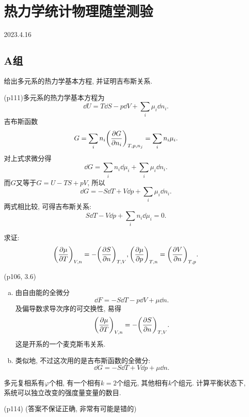 \section{热力学统计物理随堂测验}
2023.4.16
\subsection{A组}
\begin{questions}
  \question 给出多元系的热力学基本方程, 并证明吉布斯关系.
  \begin{solution}
    (p111)多元系的热力学基本方程为
    \begin{equation}
      \dd U = T\dd S - p\dd V + \sum_i \mu_i\dd n_i.
    \end{equation}
    吉布斯函数
    \begin{equation}
      G = \sum_i n_i\qty(\pdv{G}{n_i})_{T,p,n_j} = \sum_i n_i \mu_i.
    \end{equation}
    对上式求微分得
    \begin{equation}
      \dd G = \sum_i n_i\dd \mu_i + \sum_i \mu_i\dd n_i.
    \end{equation}
    而$G$又等于$G=U-TS+pV$, 所以
    \begin{equation}
      \dd G = -S\dd T + V\dd p + \sum_i \mu_i\dd n_i.
    \end{equation}
    两式相比较, 可得吉布斯关系:
    \begin{equation}
      S\dd T - V\dd p +\sum_i n_i\dd \mu_i = 0.
    \end{equation}
  \end{solution}
  \question 求证:
  \begin{equation}
    \qty(\pdv{\mu}{T})_{V,n} = - \qty(\pdv{S}{n})_{T,V}, \qty(\pdv{\mu}{p})_{T,n} = \qty(\pdv{V}{n})_{T,p}.
  \end{equation}
  \begin{solution}
    (p106, 3.6)
    \begin{enumerate}[(a)]
      \item 由自由能的全微分
            \begin{equation}
              \dd F = - S\dd T - p\dd V + \mu\dd n.
            \end{equation}
            及偏导数求导次序的可交换性, 易得
            \begin{equation}
              \qty(\pdv{\mu}{T})_{V,n} = - \qty(\pdv{S}{n})_{T,V}.
            \end{equation}
            这是开系的一个麦克斯韦关系.
      \item 类似地, 不过这次用的是吉布斯函数的全微分:
            \begin{equation}
              \dd G = -S\dd T + V\dd p + \mu\dd n.
            \end{equation}
    \end{enumerate}
  \end{solution}
  \question 多元复相系有$\varphi$个相, 有一个相有$k=2$个组元, 其他相有$k$个组元. 计算平衡状态下, 系统可以独立改变的强度量变量的数目.
  \begin{solution}
    {(p114)\color{gray} (答案不保证正确, 非常有可能是错的)

}
\end{solution}
\end{questions}
